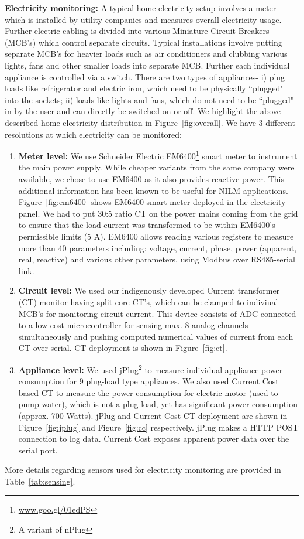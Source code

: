\documentclass[10pt]{sensys-proc}
\newcommand{\figref}[1]{Figure~\ref{#1}}
\newcommand{\tabref}[1]{Table~\ref{#1}}
\begin{document}
\noindent\textbf{Electricity monitoring:} A typical home electricity setup involves a meter which is installed by utility companies and measures overall electricity usage. Further electric cabling is divided into various Miniature Circuit Breakers (MCB's) which control separate circuits. Typical installations involve putting separate MCB's for heavier loads such as air conditioners and clubbing various lights, fans and other smaller loads into separate MCB. Further each individual appliance is controlled via a switch. There are two types of appliances- i) plug loads like refrigerator and electric iron, which need to be physically ``plugged" into the sockets; ii) loads like lights and fans, which do not need to be ``plugged" in by the user and can directly be switched on or off. We highlight the above described home electricity distribution in \figref{fig:overall}. We have 3 different resolutions at which electricity can be monitored:
\begin{enumerate}
\item \textbf{Meter level:} We use Schneider Electric EM6400\footnote{\url{www.goo.gl/01edPS}} smart meter to instrument the main power supply. While cheaper variants from the same company were available, we chose to use EM6400 as it also provides reactive power. This additional information has been known to be useful for NILM applications\cite{hart}. \figref{fig:em6400} shows EM6400 smart meter deployed in the electricity panel. We had to put 30:5 ratio CT on the power mains coming from the grid to ensure that the load current was transformed to be within EM6400's permissible limits (5 A). EM6400 allows reading various registers to measure more than 40 parameters including: voltage, current, phase, power (apparent, real, reactive) and various other parameters, using Modbus over RS485-serial link.

\item \textbf{Circuit level:} We used our indigenously developed Current transformer (CT) monitor having split core CT's, which can be clamped to indiviual MCB's for monitoring circuit current. This device consists of ADC connected to a low cost microcontroller for sensing max. 8 analog channels simultaneously and pushing computed numerical  values of current from each CT over serial. CT deployment is shown in \figref{fig:ct}.

\item \textbf{Appliance level:} We used jPlug\footnote{A variant of nPlug\cite{nplug}} to measure individual appliance power consumption for 9 plug-load type appliances. We also used Current Cost based CT to measure the power consumption for electric motor (used to pump water), which is not a plug-load, yet has significant power consumption (approx. 700 Watts). jPlug and Current Cost CT deployment are shown in \figref{fig:jplug} and \figref{fig:cc} respectively. jPlug makes a HTTP POST connection to log data. Current Cost exposes apparent power data over the serial port.
\end{enumerate}
More details regarding sensors used for electricity monitoring are provided in \tabref{tab:sensing}.
\end{document}

